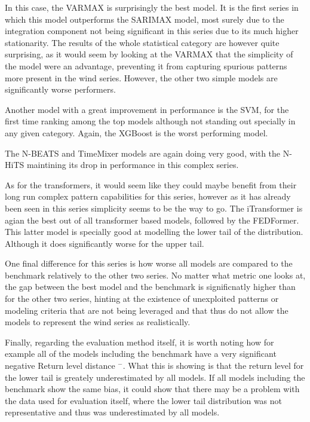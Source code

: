 In this case, the VARMAX is surprisingly the best model. It is the first series in which this model outperforms the SARIMAX model, most surely due to the integration component not being significant in this series due to its much higher stationarity. The results of the whole statistical category are however quite surprising, as it would seem by looking at the VARMAX that the simplicity of the model were an advantage, preventing it from capturing spurious patterns more present in the wind series. However, the other two simple models are significantly worse performers. 

Another model with a great improvement in performance is the SVM, for the first time ranking among the top models although not standing out specially in any given category. Again, the XGBoost is the worst performing model.

The N-BEATS and TimeMixer models are again doing very good, with the N-HiTS maintining its drop in performance in this complex series. 

As for the transformers, it would seem like they could maybe benefit from their long run complex pattern capabilities for this series, however as it has already been seen in this series simplicity seems to be the way to go. The iTransformer is agian the best out of all transformer based models, followed by the FEDFormer. This latter model is specially good at modelling the lower tail of the distribution. Although it does significantly worse for the upper tail. 

One final difference for this series is how worse all models are compared to the benchmark relatively to the other two series. No matter what metric one looks at, the gap between the best model and the benchmark is significnatly higher than for the other two series, hinting at the existence of unexploited patterns or modeling criteria that are not being leveraged and that thus do not allow the models to represent the wind series as realistically. 

Finally, regarding the evaluation method itself, it is worth noting how for example all of the models including the benchmark have a very significant negative Return level distance $^-$. What this is showing is that the return level for the lower tail is greately underestimated by all models. If all models including the benchmark show the same bias, it could show that there may be a problem with the data used for evaluation itself, where the lower tail distribution was not representative and thus was underestimated by all models.

